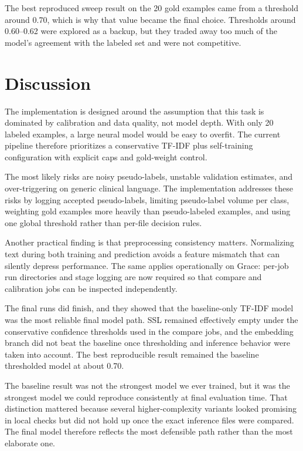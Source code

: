 \documentclass[journal]{IEEEtran}
\begin{document}
The best reproduced sweep result on the 20 gold examples came from a threshold around 0.70, which is why that value became the final choice. Thresholds around 0.60--0.62 were explored as a backup, but they traded away too much of the model's agreement with the labeled set and were not competitive.

\section{Discussion}

The implementation is designed around the assumption that this task is dominated by calibration and data quality, not model depth. With only 20 labeled examples, a large neural model would be easy to overfit. The current pipeline therefore prioritizes a conservative TF-IDF plus self-training configuration with explicit caps and gold-weight control.

The most likely risks are noisy pseudo-labels, unstable validation estimates, and over-triggering on generic clinical language. The implementation addresses these risks by logging accepted pseudo-labels, limiting pseudo-label volume per class, weighting gold examples more heavily than pseudo-labeled examples, and using one global threshold rather than per-file decision rules.

Another practical finding is that preprocessing consistency matters. Normalizing text during both training and prediction avoids a feature mismatch that can silently depress performance. The same applies operationally on Grace: per-job run directories and stage logging are now required so that compare and calibration jobs can be inspected independently.

The final runs did finish, and they showed that the baseline-only TF-IDF model was the most reliable final model path. SSL remained effectively empty under the conservative confidence thresholds used in the compare jobs, and the embedding branch did not beat the baseline once thresholding and inference behavior were taken into account. The best reproducible result remained the baseline thresholded model at about 0.70.

The baseline result was not the strongest model we ever trained, but it was the strongest model we could reproduce consistently at final evaluation time. That distinction mattered because several higher-complexity variants looked promising in local checks but did not hold up once the exact inference files were compared. The final model therefore reflects the most defensible path rather than the most elaborate one.
\end{document}
